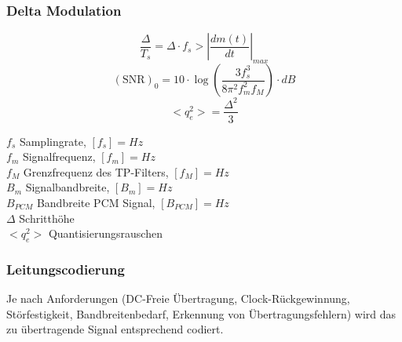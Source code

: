 \subsubsection{Delta Modulation}
\begin{minipage}{9cm}
$$ \frac{\Delta}{T_s} = \Delta \cdot f_s > \left| \frac{d m(t)}{dt} \right|_{max}$$
$$ (\text{SNR})_0 = 10 \cdot \log\left(\frac{3 f_s^3}{8 \pi^2 f_m^2 f_M}\right) \cdot dB$$ 
$$ <q_e^2> = \frac{\Delta^2}{3} $$ 
\end{minipage}
\begin{minipage}{9cm}
	$f_s$ Samplingrate, $[f_s] = Hz$ \\
	$f_m$ Signalfrequenz, $[f_m] = Hz$ \\
	$f_M$ Grenzfrequenz des TP-Filters, $[f_M] = Hz$ \\
	$B_m$ Signalbandbreite, $[B_m] = Hz $ \\
	$B_{PCM}$ Bandbreite PCM Signal, $[B_{PCM}] = Hz $\\
	$\Delta$ Schritthöhe\\
	$<q_e^2>$ Quantisierungsrauschen \\
	
\end{minipage}

\subsubsection{Leitungscodierung}
Je nach Anforderungen (DC-Freie Übertragung, Clock-Rückgewinnung, Störfestigkeit,
Bandbreitenbedarf, Erkennung von Übertragungsfehlern) wird das zu übertragende Signal entsprechend
codiert.

